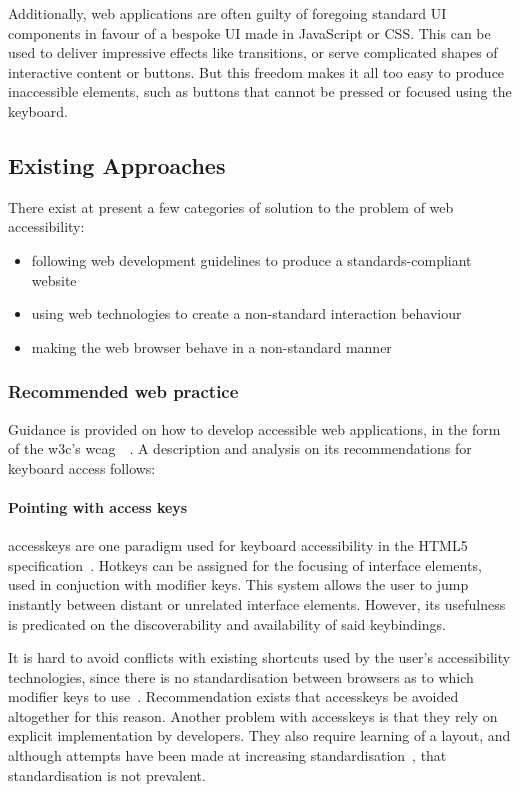 \documentclass[11pt,openright,a4paper]{report}
\begin{document}
Additionally, web applications are often guilty of foregoing standard UI components in favour of a bespoke UI made in JavaScript or CSS. This can be used to deliver impressive effects like transitions, or serve complicated shapes of interactive content or buttons. But this freedom makes it all too easy to produce inaccessible elements, such as buttons that cannot be pressed or focused using the keyboard.

\subsection{Existing Approaches}
There exist at present a few categories of solution to the problem of web accessibility:
\begin{itemize}
\item following web development guidelines to produce a standards-compliant website
\item using web technologies to create a non-standard interaction behaviour
\item making the web browser behave in a non-standard manner
\end{itemize}
\subsubsection{Recommended web practice}
\label{recommendedpracticesection}
Guidance is provided on how to develop accessible web applications, in the form of the \gls{w3c}'s \gls{wcag}~\cite{chisholm2001web}~\cite{wcag}. A description and analysis on its recommendations for keyboard access follows:
\paragraph{Pointing with access keys}
\label{accesskeysection}
  \Gls{accesskeys} are one paradigm used for keyboard accessibility in the HTML5 specification~\cite{html5specaccesskeys}. Hotkeys can be assigned for the focusing of interface elements, used in conjuction with modifier keys. This system allows the user to jump instantly between distant or unrelated interface elements. However, its usefulness is predicated on the discoverability and availability of said \glspl{keybinding}.

  It is hard to avoid conflicts with existing shortcuts used by the user's accessibility technologies, since there is no standardisation between browsers as to which modifier keys to use~\cite{webaimaccesskeys}. Recommendation exists that \gls{accesskeys} be avoided altogether for this reason. Another problem with \gls{accesskeys} is that they rely on explicit implementation by developers. They also require learning of a layout, and although attempts have been made at increasing standardisation~\cite{AccesskeyStandardisation}, that standardisation is not prevalent.
\end{document}
